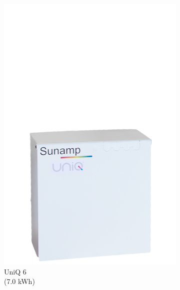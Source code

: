 \begin{figure}[htbp]
\begin{subfigure}{.24\textwidth}
		\includegraphics[width=\textwidth]{figures/sunamp-uniq-6.png}
		\caption{UniQ 6\\
			(7.0 kWh)}
		\label{fig:uniq6}
	\end{subfigure}
	\begin{subfigure}{.24\textwidth}
	\centering

\end{subfigure}
\end{figure}
